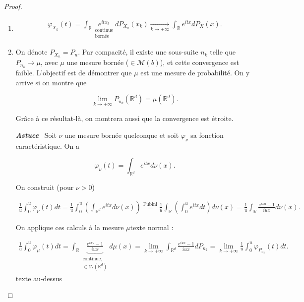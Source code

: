 \documentclass[french]{book}
\theoremstyle{definition}
\theoremstyle{remark}
\newcommand{\biggg}{>}
\newcommand{\bg}{\biggg}
\begin{document}
\begin{proof}

  \

  \begin{enumerate}
    \item
      \begin{gather*}
        \varphi _{X_k}(t) = \int_{\mathbb{R}}^{} \underset{\substack{\text{continue} \\ \text{bornée}}}{e^{itx_k}} d P _{X_k}(x_k)  \underset{k \to +\infty }{\longrightarrow}  \int_{\mathbb{R}} e^{itx} d P_X(x).
      \end{gather*}

    \item On dénote \(P _{X_n} = P_n\). Par compacité, il existe une sous-suite \(n_k\) telle que \(P _{n_k} \longrightarrow \mu\), avec \(\mu\) une mesure bornée (\(\in \mathscr{M}(b)\)), et cette convergence est faible. L'objectif est de démontrer que \(\mu\) est une mesure de probabilité. On y arrive si on montre que

    \[\lim_{k \to +\infty} P _{n_k}(\mathbb{R}^d) = \mu(\mathbb{R}^d). \]

    Grâce à ce résultat-là, on montrera aussi que la convergence est étroite.

    \textbf{\emph{Astuce}} \ Soit \(\nu\) une mesure bornée quelconque et soit \(\varphi _{\nu}\) sa fonction caractéristique. On a

    \[\varphi _{\nu}(t) = \int_{\mathbb{R}^d} e^{itx} d \nu(x).\]

    On construit (pour \(\nu \bg 0\))

    \begin{gather*}
      \frac{1}{u} \int_{0}^{u} \varphi _{\nu}(t)dt = \frac{1}{u}\int_{0}^{u}\left(\int_{\mathbb{R}^d} e^{itx}d \nu(x)  \right) \stackrel{\text{Fubini}}{=} \frac{1}{u}\int_{\mathbb{R}} \left(\int_{0}^{u} e^{itx}dt  \right) d \nu(x)  = \frac{1}{u} \int_{\mathbb{R}} \frac{e^{ixu}-1 }{iux}d \nu(x).
    \end{gather*}

    On applique ces calculs à la mesure \(\mu\)texte normal :

    \begin{gather}
      \frac{1}{u} \int_{0}^{u} \varphi_\mu(t)dt = \int_{\mathbb{R}} \underbrace{\frac{e^{ixu}-1 }{iux}}_{\substack{\text{continue},\\\in \mathscr{C}_b(\mathbb{R}^d)}}d \mu(x)  = \lim_{k \to +\infty} \int_{\mathbb{R}^d} \frac{e^{iux}-1}{iux} d P _{n_k}  = \lim_{k \to+\infty} \frac{1}{u} \int_{0}^{u} \varphi_{P_{n_k}}(t)dt.  \label{equation45}
    \end{gather}texte au-dessus


\end{enumerate}
\end{proof}
\end{document}
